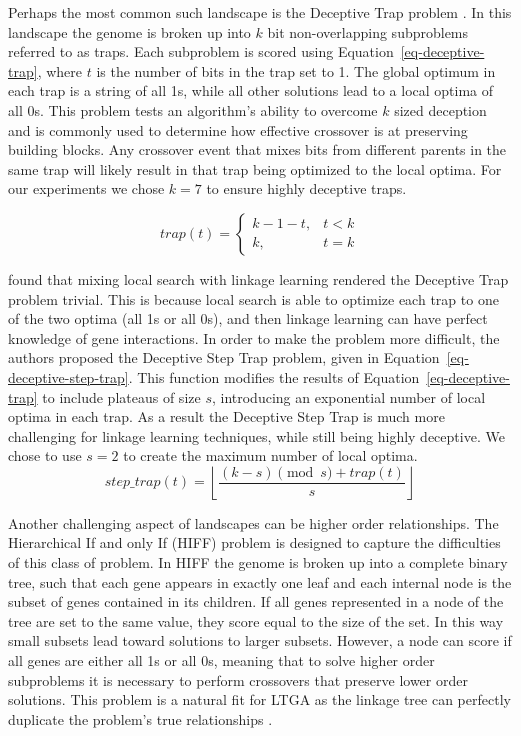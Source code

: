 \documentclass[twoside]{article}
\begin{document}
Perhaps the most common such landscape is the Deceptive Trap problem \citep{goldberg:1991:gasize}.
In this landscape the genome is broken up into $k$ bit non-overlapping subproblems referred
to as traps.
Each subproblem is scored using Equation~\ref{eq-deceptive-trap}, where $t$ is the number of
bits in the trap set to 1. The global optimum in each trap is a string of all 1s, while all
other solutions lead to a local optima of all 0s. This problem tests an algorithm's
ability to overcome $k$ sized deception and is commonly used to determine how effective crossover
is at preserving building blocks. Any crossover event that mixes bits from different parents in
the same trap will likely result in that trap being optimized to the local optima. For our experiments
we chose $k=7$ to ensure highly deceptive traps.

\begin{equation}
   trap(t) = \left\{
     \begin{array}{rl}
       k-1-t, &  t<k\\
       k,   &  t = k
     \end{array}
   \right.
  \label{eq-deceptive-trap}
\end{equation}

\cite{goldman:2012:ltga} found that mixing local search with linkage learning rendered the Deceptive
Trap problem trivial. This is because local search is able to optimize each trap to one of the two
optima (all 1s or all 0s), and then linkage learning can have perfect knowledge of gene interactions.
In order to make the problem more difficult, the authors proposed the Deceptive
Step Trap problem, given in Equation~\ref{eq-deceptive-step-trap}. This function modifies the results
of Equation~\ref{eq-deceptive-trap} to include plateaus of size $s$, introducing an exponential number
of local optima in each trap. As a result the Deceptive Step Trap is much more challenging for linkage
learning techniques, while still being highly deceptive. We chose to use $s=2$ to create the maximum
number of local optima.
\begin{equation}
   step\_trap(t) = \left \lfloor \frac{(k-s)\pmod{s} + trap(t)}{s} \right \rfloor
  \label{eq-deceptive-step-trap}
\end{equation}

Another challenging aspect of landscapes can be higher order relationships. The Hierarchical If
and only If (HIFF) problem is designed to capture the difficulties of this class of problem.
In HIFF the genome is broken up into a complete binary tree, such that each gene appears in exactly one
leaf and each internal node is the subset of genes contained in its children. If all genes represented
in a node of the tree are set to the same value, they score equal to the size of the set. In this way
small subsets lead toward solutions to larger subsets. However, a node can score if all genes are either
all 1s or all 0s, meaning that to solve higher order subproblems it is necessary to perform crossovers
that preserve lower order solutions. This problem is a natural fit for LTGA as the linkage tree can
perfectly duplicate the problem's true relationships \citep{thierens:2013:ltgahiff}.
\end{document}
